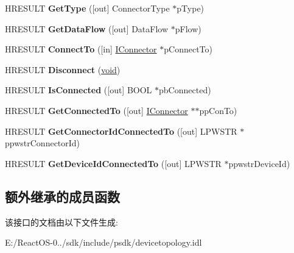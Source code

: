 \begin{DoxyCompactItemize}
\item 
\mbox{\label{interface_i_connector_aff26dbfa6b27f7b35f751179b2385f70}} 
H\+R\+E\+S\+U\+LT {\bfseries Get\+Type} (\mbox{[}out\mbox{]} Connector\+Type $\ast$p\+Type)
\item 
\mbox{\label{interface_i_connector_a06f3df8a32fc67fe8b5b1e8df7721132}} 
H\+R\+E\+S\+U\+LT {\bfseries Get\+Data\+Flow} (\mbox{[}out\mbox{]} Data\+Flow $\ast$p\+Flow)
\item 
\mbox{\label{interface_i_connector_a3befbeffefcfad188270c30c80f7e3a2}} 
H\+R\+E\+S\+U\+LT {\bfseries Connect\+To} (\mbox{[}in\mbox{]} \hyperlink{interface_i_connector}{I\+Connector} $\ast$p\+Connect\+To)
\item 
\mbox{\label{interface_i_connector_a46966c224493ad31b996ce3df6739a88}} 
H\+R\+E\+S\+U\+LT {\bfseries Disconnect} (\hyperlink{interfacevoid}{void})
\item 
\mbox{\label{interface_i_connector_aeea56f57245f0474a161956f0935815d}} 
H\+R\+E\+S\+U\+LT {\bfseries Is\+Connected} (\mbox{[}out\mbox{]} B\+O\+OL $\ast$pb\+Connected)
\item 
\mbox{\label{interface_i_connector_ab5f91d5d331a3076931edbc2d2c117ba}} 
H\+R\+E\+S\+U\+LT {\bfseries Get\+Connected\+To} (\mbox{[}out\mbox{]} \hyperlink{interface_i_connector}{I\+Connector} $\ast$$\ast$pp\+Con\+To)
\item 
\mbox{\label{interface_i_connector_a611d40746fb8b843e0edf46fd4c7f085}} 
H\+R\+E\+S\+U\+LT {\bfseries Get\+Connector\+Id\+Connected\+To} (\mbox{[}out\mbox{]} L\+P\+W\+S\+TR $\ast$ppwstr\+Connector\+Id)
\item 
\mbox{\label{interface_i_connector_a658a1b2296844d3e4fddc67d4a153176}} 
H\+R\+E\+S\+U\+LT {\bfseries Get\+Device\+Id\+Connected\+To} (\mbox{[}out\mbox{]} L\+P\+W\+S\+TR $\ast$ppwstr\+Device\+Id)
\end{DoxyCompactItemize}
\subsection*{额外继承的成员函数}


该接口的文档由以下文件生成\+:\begin{DoxyCompactItemize}
\item 
E\+:/\+React\+O\+S-\/0../sdk/include/psdk/devicetopology.\+idl\end{DoxyCompactItemize}
